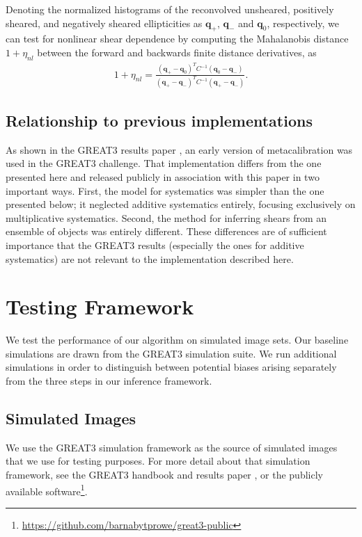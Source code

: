 \documentclass[iop]{emulateapj}
\begin{document}
Denoting the normalized histograms of the reconvolved unsheared,
positively sheared, and negatively sheared ellipticities as
$\mathbf{q}_+$, $\mathbf{q}_-$ and $\mathbf{q}_0$, respectively, we
can test for nonlinear shear dependence by computing the Mahalanobis
distance $1+\eta_{nl}$ between the forward and backwards finite distance
derivatives, as
\begin{align}
1+\eta_{nl} = \frac{(\mathbf{q}_{+} - \mathbf{q}_{0})^T C^{-1} (\mathbf{q}_{0} - \mathbf{q}_{-})}{(\mathbf{q}_+ -
  \mathbf{q}_ -)^TC^{-1}(\mathbf{q}_+ - \mathbf{q}_-)}.
\end{align}


\subsection{Relationship to previous implementations}

As shown in the GREAT3 results paper \citep{2015MNRAS.450.2963M}, an
early version of metacalibration was used in the GREAT3 challenge.
That implementation differs from the one presented here and released
publicly in association with this paper in two important ways.  First,
the model for systematics was simpler than the one presented below; it
neglected additive systematics entirely, focusing exclusively on
multiplicative systematics. Second, the method for inferring shears
from an ensemble of objects was entirely different.  These differences
are of sufficient importance that the GREAT3 results (especially the
ones for additive systematics) are not relevant to the implementation
described here.


\section{Testing Framework}
We test the performance of our algorithm on simulated image sets. Our
baseline simulations are drawn from the GREAT3 simulation suite. We
run additional simulations in order to distinguish between potential
biases arising separately from the three steps in our inference
framework.


\subsection{Simulated Images}

We use the GREAT3 simulation framework as the source of simulated
images that we use for testing purposes.  For more detail about that
simulation framework, see the GREAT3 handbook
\citep{2014ApJS..212....5M} and results paper
\citep{2015MNRAS.450.2963M}, or the publicly available
software\footnote{\url{https://github.com/barnabytprowe/great3-public}}.
\end{document}
